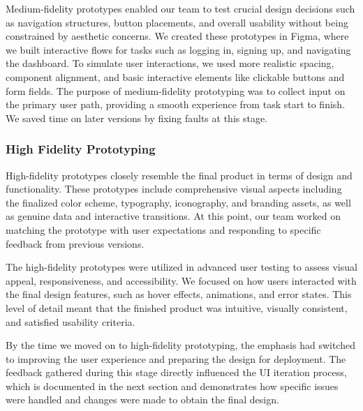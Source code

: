 Medium-fidelity prototypes enabled our team to test crucial design decisions
such as navigation structures, button placements, and overall usability without
being constrained by aesthetic concerns. We created these prototypes in Figma,
where we built interactive flows for tasks such as logging in, signing up, and
navigating the dashboard. To simulate user interactions, we used more realistic
spacing, component alignment, and basic interactive elements like clickable
buttons and form fields. The purpose of medium-fidelity prototyping was to
collect input on the primary user path, providing a smooth experience from task
start to finish. We saved time on later versions by fixing faults at this
stage.

\subsubsection{High Fidelity Prototyping}
High-fidelity prototypes closely resemble the final product in terms of design
and functionality. These prototypes include comprehensive visual aspects
including the finalized color scheme, typography, iconography, and branding
assets, as well as genuine data and interactive transitions. At this point, our
team worked on matching the prototype with user expectations and responding to
specific feedback from previous versions.

The high-fidelity prototypes were utilized in advanced user testing to assess
visual appeal, responsiveness, and accessibility. We focused on how users
interacted with the final design features, such as hover effects, animations,
and error states. This level of detail meant that the finished product was
intuitive, visually consistent, and satisfied usability criteria.

By the time we moved on to high-fidelity prototyping, the emphasis had switched
to improving the user experience and preparing the design for deployment. The
feedback gathered during this stage directly influenced the UI iteration
process, which is documented in the next section and demonstrates how specific
issues were handled and changes were made to obtain the final design.



